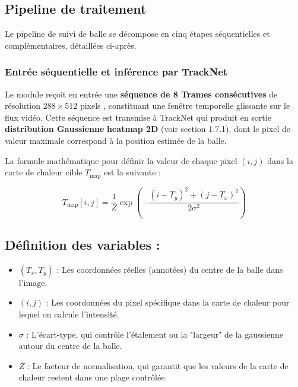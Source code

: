 \subsection{Pipeline de traitement}
\label{subsec:pipeline}
 
Le pipeline de suivi de balle se décompose en cinq étapes séquentielles
et complémentaires, détaillées ci-après.
 
\subsubsection{Entrée séquentielle et inférence par TrackNet}
\label{subsubsec:tracknet_inference}
 
Le module reçoit en entrée une \textbf{séquence de  8 Trames
consécutives }de résolution $288 \times 512$ pixels , constituant une fenêtre 
temporelle glissante sur le flux vidéo. Cette séquence est transmise à 
TrackNet qui produit en sortie \textbf{distribution Gaussienne} \textbf{heatmap 2D} (voir section 1.7.1), 
dont le pixel de valeur maximale correspond à la position estimée de la balle.

La formule mathématique pour définir la valeur de chaque pixel $(i, j)$ dans la carte de chaleur cible $T_{\text{map}}$ est la suivante :

\begin{equation}
    T_{\text{map}}[i, j] = \frac{1}{Z} \exp \left( -\frac{(i - T_y)^2 + (j - T_x)^2}{2\sigma^2} \right)
\end{equation}

\subsection*{Définition des variables :}
\begin{itemize}
    \item $(T_x, T_y)$ : Les coordonnées réelles (annotées) du centre de la balle dans l'image.
    \item $(i, j)$ : Les coordonnées du pixel spécifique dans la carte de chaleur pour lequel on calcule l'intensité.
    \item $\sigma$ : L'écart-type, qui contrôle l'étalement ou la "largeur" de la gaussienne autour du centre de la balle.
    \item $Z$ : Le facteur de normalisation, qui garantit que les valeurs de la carte de chaleur restent dans une plage contrôlée.
\end{itemize}

